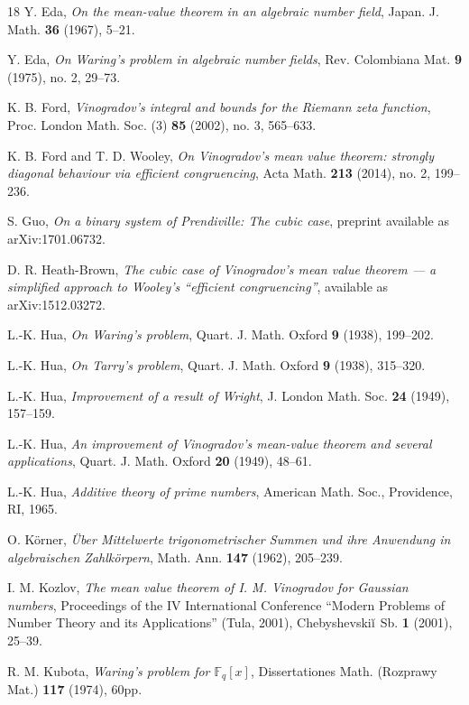 \documentclass[12pt,reqno]{amsart}
\theoremstyle{definition}
\theoremstyle{remark}
\numberwithin{equation}{section}
\def\dbF{{\mathbb F}}\def\dbK{{\mathbb K}}
\begin{document}
\begin{thebibliography}{18}
Y. Eda, \emph{On the mean-value theorem in an algebraic number field}, Japan. J. Math. 
\textbf{36} (1967), 5--21.

Y. Eda, \emph{On Waring's problem in algebraic number fields}, Rev. Colombiana Mat. 
\textbf{9} (1975), no. 2, 29--73.

K. B. Ford, \emph{Vinogradov's integral and bounds for the Riemann zeta function}, Proc. 
London Math. Soc. (3) \textbf{85} (2002), no. 3, 565--633.

K. B. Ford and T. D. Wooley, \emph{On Vinogradov's mean value theorem: strongly 
diagonal behaviour via efficient congruencing}, Acta Math. \textbf{213} (2014), no. 2, 
199--236.

S. Guo, \emph{On a binary system of Prendiville: The cubic case}, preprint available as 
arXiv:1701.06732.

D. R. Heath-Brown, \emph{The cubic case of Vinogradov's mean value theorem --- a 
simplified approach to Wooley's ``efficient congruencing''}, available as arXiv:1512.03272.

L.-K. Hua, \emph{On Waring's problem}, Quart. J. Math. Oxford \textbf{9} (1938), 
199--202.

L.-K. Hua, \emph{On Tarry's problem}, Quart. J. Math. Oxford \textbf{9} (1938), 315--320.

L.-K. Hua, \emph{Improvement of a result of Wright}, J. London Math. Soc. \textbf{24} 
(1949), 157--159.

L.-K. Hua, \emph{An improvement of Vinogradov’s mean-value theorem and several 
applications}, Quart. J. Math. Oxford \textbf{20} (1949), 48--61.

L.-K. Hua, \emph{Additive theory of prime numbers}, American Math. Soc., Providence, RI, 
1965.

O. K\"orner, \emph{\"Uber Mittelwerte trigonometrischer Summen und ihre Anwendung in 
algebraischen Zahlk\"orpern}, Math. Ann. \textbf{147} (1962), 205--239.

I. M. Kozlov, \emph{The mean value theorem of I. M. Vinogradov for Gaussian numbers}, 
Proceedings of the IV International Conference ``Modern Problems of Number Theory and 
its Applications'' (Tula, 2001), Chebyshevski$\breve{\text{\i}}$ Sb. \textbf{1} (2001), 
25--39.

R. M. Kubota, \emph{Waring's problem for $\dbF_q[x]$}, Dissertationes Math. (Rozprawy 
Mat.) \textbf{117} (1974), 60pp.


\end{thebibliography}
\end{document}
